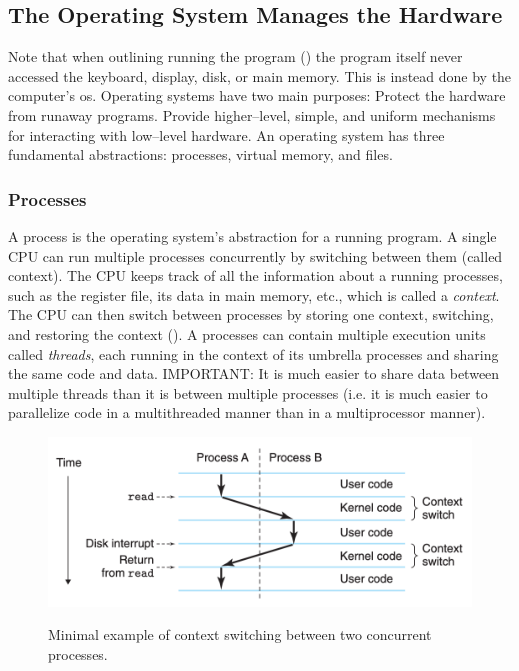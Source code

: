 \documentclass[../bryant_comp_sys.tex]{subfiles}
\begin{document}
    \subsection{The Operating System Manages the Hardware}
        \begin{outline}
            \1 Note that when outlining running the program () the program itself never accessed the keyboard, display, disk, or main memory.
            \1 This is instead done by the computer's \gls{os}.
            \1 Operating systems have two main purposes:
                \2 Protect the hardware from runaway programs.
                \2 Provide higher--level, simple, and uniform mechanisms for interacting with low--level hardware.
            \1 An operating system has three fundamental abstractions: processes, virtual memory, and files.
        \end{outline}

        \subsubsection{Processes}
            \begin{outline}
                \1 A \gls{process} is the operating system's abstraction for a running program.
                \1 A single CPU can run multiple processes concurrently by switching between them (called \gls{context}). The CPU keeps track of all the information about a running processes, such as the register file, its data in main memory, etc., which is called a \textit{context}. The CPU can then switch between processes by storing one context, switching, and restoring the context ().
                \1 A processes can contain multiple execution units called \textit{threads}, each running in the context of its umbrella processes and sharing the same code and data.
                \1 IMPORTANT: It is much easier to share data between multiple threads than it is between multiple processes (i.e. it is much easier to parallelize code in a multithreaded manner than in a multiprocessor manner).
            \end{outline}

            \begin{figure}
                \centering
                \includegraphics[width=0.5\linewidth]{ch1/figs/context_switching.png}
                \label{fig:context_switching}
                \caption{Minimal example of context switching between two concurrent processes.}
            \end{figure}
\end{document}
